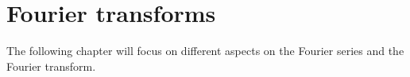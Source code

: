 \chapter{Fourier transforms} \label{ch5}
The following chapter will focus on different aspects on the Fourier series and the Fourier transform.



